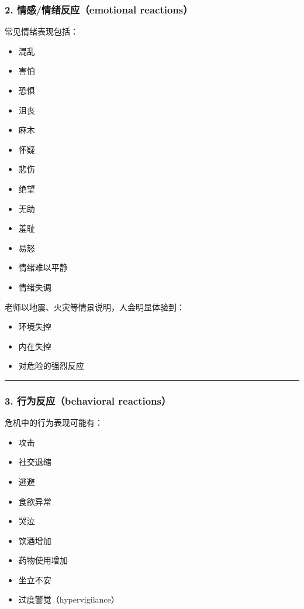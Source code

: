 \documentclass[
  chinese,
  9pt,
  a4paper,
]{ctexart}
\providecommand{\tightlist}{%
  \setlength{\itemsep}{0pt}\setlength{\parskip}{0pt}}
\begin{document}
\subsubsection{2. 情感/情绪反应（emotional
reactions）}\label{ux60c5ux611fux60c5ux7eeaux53cdux5e94emotional-reactions}

常见情绪表现包括：

\begin{itemize}
\tightlist
\item
  混乱
\item
  害怕
\item
  恐惧
\item
  沮丧
\item
  麻木
\item
  怀疑
\item
  悲伤
\item
  绝望
\item
  无助
\item
  羞耻
\item
  易怒
\item
  情绪难以平静
\item
  情绪失调
\end{itemize}

老师以地震、火灾等情景说明，人会明显体验到：

\begin{itemize}
\tightlist
\item
  环境失控
\item
  内在失控
\item
  对危险的强烈反应
\end{itemize}

\begin{center}\rule{0.5\linewidth}{0.5pt}\end{center}

\subsubsection{3. 行为反应（behavioral
reactions）}\label{ux884cux4e3aux53cdux5e94behavioral-reactions}

危机中的行为表现可能有：

\begin{itemize}
\tightlist
\item
  攻击
\item
  社交退缩
\item
  逃避
\item
  食欲异常
\item
  哭泣
\item
  饮酒增加
\item
  药物使用增加
\item
  坐立不安
\item
  过度警觉（hypervigilance）
\end{itemize}
\end{document}

